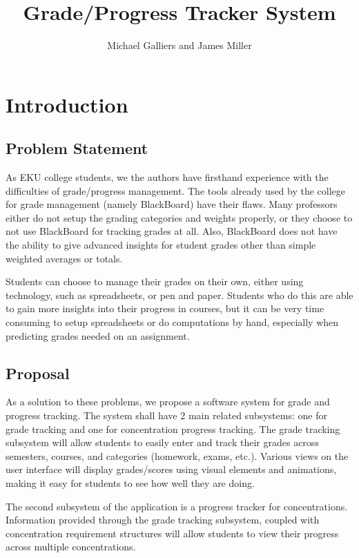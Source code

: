 \documentclass[12pt]{article}
\author{Michael Galliers and James Miller}
\title{Grade/Progress Tracker System}
\begin{document}
\begin{titlepage}
\maketitle
\end{titlepage}

\newpage
    \tableofcontents
\newpage

\thispagestyle{empty}
\listoffigures
\newpage

\section{Introduction}
\subsection{Problem Statement}
As EKU college students, we the authors have firsthand experience with the difficulties of
grade/progress management. The tools already used by the college for grade management (namely
BlackBoard) have their flaws. Many professors either do not setup the grading categories and weights
properly, or they choose to not use BlackBoard for tracking grades at all. Also, BlackBoard does not
have the ability to give advanced insights for student grades other than simple weighted averages or
totals.

Students can choose to manage their grades on their own, either using technology, such as
spreadsheets, or pen and paper. Students who do this are able to gain more insights into their
progress in courses, but it can be very time consuming to setup spreadsheets or do computations by
hand, especially when predicting grades needed on an assignment.

\subsection{Proposal}
As a solution to these problems, we propose a software system for grade and progress tracking. The
system shall have 2 main related subsystems: one for grade tracking and one for concentration
progress tracking. The grade tracking subsystem will allow students to easily enter and track their
grades across semesters, courses, and categories (homework, exams, etc.). Various views on the user
interface will display grades/scores using visual elements and animations, making it easy for
students to see how well they are doing.

The second subsystem of the application is a progress tracker for concentrations. Information
provided through the grade tracking subsystem, coupled with concentration requirement structures
will allow students to view their progress across multiple concentrations.
\end{document}
